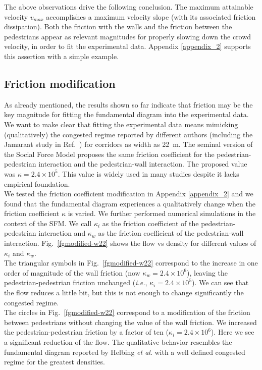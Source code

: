 The above observations drive the following conclusion. The maximum attainable velocity $v_{max}$ accomplishes a maximum velocity slope (with its associated friction dissipation). Both the friction with the walls and the friction between the pedestrians appear as relevant magnitudes for properly slowing down the crowd velocity, in order to fit the experimental data. Appendix \ref{appendix_2} supports this assertion with a simple example.  

\subsection{Friction modification}

As already mentioned, the results shown so far indicate that friction may be the key magnitude for fitting the fundamental diagram into the experimental data. We want to make clear that fitting the experimental data means mimicking (qualitatively) the congested regime reported by different authors (including the Jamaraat study in Ref.~\cite{helbing3}) for corridors as width as 22~m. The seminal version of the Social Force Model proposes the same friction coefficient for the pedestrian-pedestrian interaction and the pedestrian-wall interaction. The proposed value was $\kappa = 2.4\times10^{5}$. This value is widely used in many studies despite it lacks empirical foundation. \\

{\color{red} We tested the friction coefficient modification in Appendix \ref{appendix_2} and we found that the fundamental diagram experiences a qualitatively change when the friction coefficient $\kappa$ is varied. We further performed numerical simulations in the context of the SFM. We call $\kappa_i$ as the friction coefficient of the pedestrian-pedestrian interaction and $\kappa_w$ as the friction coefficient of the pedestrian-wall interaction. Fig.~\ref{fgmodified-w22} shows the flow vs density for different values of $\kappa_i$ and $\kappa_w$.}\\

The triangular symbols in Fig.~\ref{fgmodified-w22} correspond to the increase in one order of magnitude of the wall friction (now $\kappa_w = 2.4\times10^{6}$), leaving the pedestrian-pedestrian friction unchanged (\textit{i.e.}, $\kappa_i = 2.4\times10^{5}$). We can see that the flow reduces a little bit, but this is not enough to change significantly the congested regime. \\

The circles in Fig.~\ref{fgmodified-w22} correspond to a modification of the friction between pedestrians without changing the value of the wall friction. We increased the pedestrian-pedestrian friction by a factor of ten ($\kappa_i = 2.4\times10^{6}$). Here we see a significant reduction of the flow. The qualitative behavior resembles the fundamental diagram reported by Helbing \textit{et al}. with a well defined congested regime for the greatest densities.\\

